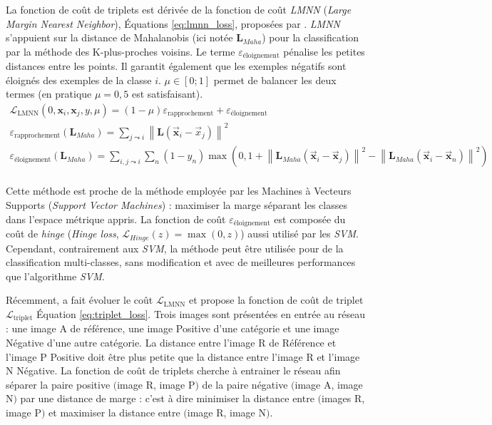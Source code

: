 La fonction de coût de triplets est dérivée de la fonction de coût \textit{LMNN} (\textit{Large Margin Nearest Neighbor}), Équations \ref{eq:lmnn_loss}, proposées par \cite{weinberger_distance_2006}. \textit{LMNN} s'appuient sur la distance de Mahalanobis \cite{mahalanobis_generalised_1936} (ici notée $\mathbf{L}_{Maha}$) pour la classification par la méthode des K-plus-proches voisins.
Le terme $\varepsilon_{\text{éloignement}}$ pénalise les petites distances entre les points. Il garantit également que les exemples négatifs sont éloignés des exemples de la classe $i$. $\mu \in [0 ; 1]$ permet de balancer les deux termes (en pratique $\mu=0,5$ est satisfaisant).
\begin{equation} \label{eq:lmnn_loss}
\begin{split}
\mathcal{L}_{\mathrm{LMNN}}(0, \mathbf{x}_i, \mathbf{x}_j, y, \mu)=(1-\mu) \varepsilon_{\text{rapprochement}} + \varepsilon_{\text{éloignement}}
\\
\varepsilon_{\text{rapprochement}}(\mathbf{L}_{Maha})=\sum_{j \leadsto i}\left\|\mathbf{L}\left(\vec{\mathbf{x}}_{i}-\vec{x}_{j}\right)\right\|^{2}
\\
\varepsilon_{\text{éloignement}}(\mathbf{L}_{Maha})=\sum_{i, j \leadsto i} \sum_{n}\left(1-y_{n}\right)\max\left(0, 1+\left\|\mathbf{L}_{Maha}\left(\vec{\mathbf{x}}_{i}-\vec{\mathbf{x}}_{j}\right)\right\|^{2}-\left\|\mathbf{L}_{Maha}\left(\vec{\mathbf{x}}_{i}-\vec{\mathbf{x}}_{n}\right)\right\|^{2}\right)
\\
\end{split}
\end{equation}

Cette méthode est proche de la méthode employée par les Machines à Vecteurs Supports (\textit{Support Vector Machines}) : maximiser la marge séparant les classes dans l'espace métrique appris.
La fonction de coût $\varepsilon_{\text{éloignement}}$ est composée du coût de \textit{hinge} (\textit{Hinge loss}, $\mathcal{L}_{Hinge}(z)=\max (0, z)$) aussi utilisé par les \textit{SVM}.
Cependant, contrairement aux \textit{SVM}, la méthode peut être utilisée pour de la classification multi-classes, sans modification et avec de meilleures performances que l'algorithme \textit{SVM}.

Récemment, \cite{schroff_facenet_2015} a fait évoluer le coût $\mathcal{L}_{\mathrm{LMNN}}$ et propose la fonction de coût de triplet $\mathcal{L}_{\mathrm{triplet}}$ Équation \ref{eq:triplet_loss}.
Trois images sont présentées en entrée au réseau : une image A de référence, une image Positive d'une catégorie et une image Négative d'une autre catégorie.
La distance entre l'image R de Référence et l'image P Positive doit être plus petite que la distance entre l'image R et l'image N Négative.
La fonction de coût de triplets cherche à entrainer le réseau afin séparer la paire positive $($image R, image P$)$ de la paire négative $($image A, image N$)$ par une distance de marge : c'est à dire minimiser la distance entre $($images R, image P$)$ et maximiser la distance entre $($image R, image N$)$.

